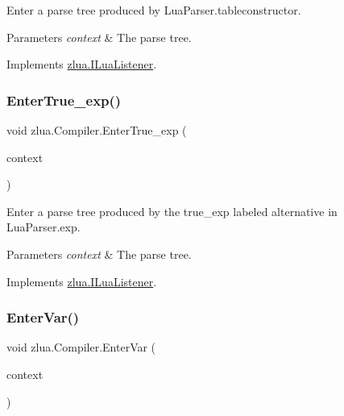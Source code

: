 Enter a parse tree produced by Lua\+Parser.\+tableconstructor. 


\begin{DoxyParams}{Parameters}
{\em context} & The parse tree.\\
\hline
\end{DoxyParams}


Implements \mbox{\hyperlink{interfacezlua_1_1_i_lua_listener_a76ec51ed7a280ef9f86058371d6fbebc}{zlua.\+I\+Lua\+Listener}}.

\mbox{\label{classzlua_1_1_compiler_acaa89ddcb610b21d92f1e3d574c678bf}} 
\subsubsection{\texorpdfstring{Enter\+True\+\_\+exp()}{EnterTrue\_exp()}}
{\footnotesize\ttfamily void zlua.\+Compiler.\+Enter\+True\+\_\+exp (\begin{DoxyParamCaption}\item[{\mbox{[}\+Not\+Null\mbox{]} \mbox{\hyperlink{classzlua_1_1_lua_parser_1_1_true__exp_context}{Lua\+Parser.\+True\+\_\+exp\+Context}}}]{context }\end{DoxyParamCaption})}



Enter a parse tree produced by the {\ttfamily true\+\_\+exp} labeled alternative in Lua\+Parser.\+exp. 


\begin{DoxyParams}{Parameters}
{\em context} & The parse tree.\\
\hline
\end{DoxyParams}


Implements \mbox{\hyperlink{interfacezlua_1_1_i_lua_listener_af32ce4f4ae58233d0a29cf03e5183347}{zlua.\+I\+Lua\+Listener}}.

\mbox{\label{classzlua_1_1_compiler_aa81e525edf991e9e6a3e391814d449fe}} 
\subsubsection{\texorpdfstring{Enter\+Var()}{EnterVar()}}
{\footnotesize\ttfamily void zlua.\+Compiler.\+Enter\+Var (\begin{DoxyParamCaption}\item[{\mbox{[}\+Not\+Null\mbox{]} \mbox{\hyperlink{classzlua_1_1_lua_parser_1_1_var_context}{Lua\+Parser.\+Var\+Context}}}]{context }\end{DoxyParamCaption})}



